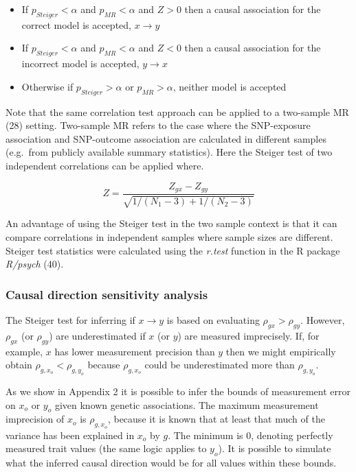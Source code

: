\documentclass[]{article}
\providecommand{\tightlist}{%
  \setlength{\itemsep}{0pt}\setlength{\parskip}{0pt}}
\begin{document}
\begin{itemize}
\tightlist
\item
  If \(p_{Steiger} < \alpha\) and \(p_{MR} < \alpha\) and \(Z > 0\) then
  a causal association for the correct model is accepted,
  \(x \rightarrow y\)
\item
  If \(p_{Steiger} < \alpha\) and \(p_{MR} < \alpha\) and \(Z < 0\) then
  a causal association for the incorrect model is accepted,
  \(y \rightarrow x\)
\item
  Otherwise if \(p_{Steiger} > \alpha\) or \(p_{MR} > \alpha\), neither
  model is accepted
\end{itemize}

Note that the same correlation test approach can be applied to a
two-sample MR (28) setting. Two-sample MR refers to the case where the
SNP-exposure association and SNP-outcome association are calculated in
different samples (e.g.~from publicly available summary statistics).
Here the Steiger test of two independent correlations can be applied
where.

\[
Z = \frac{Z_{gx} - Z_{gy}} { \sqrt{ 1 / (N_{1} - 3) + 1 / (N_{2} - 3) } }
\]

An advantage of using the Steiger test in the two sample context is that
it can compare correlations in independent samples where sample sizes
are different. Steiger test statistics were calculated using the
\emph{r.test} function in the R package \emph{R/psych} (40).

\subsubsection{Causal direction sensitivity
analysis}\label{causal-direction-sensitivity-analysis}

The Steiger test for inferring if \(x \rightarrow y\) is based on
evaluating \(\rho_{gx} > \rho_{gy}\). However, \(\rho_{gx}\) (or
\(\rho_{gy}\)) are underestimated if \(x\) (or \(y\)) are measured
imprecisely. If, for example, \(x\) has lower measurement precision than
\(y\) then we might empirically obtain \(\rho_{g,x_o} < \rho_{g,y_o}\)
because \(\rho_{g,x_o}\) could be underestimated more than
\(\rho_{g,y_o}\).

As we show in Appendix 2 it is possible to infer the bounds of
measurement error on \(x_o\) or \(y_o\) given known genetic
associations. The maximum measurement imprecision of \(x_o\) is
\(\rho_{g,x_o}\), because it is known that at least that much of the
variance has been explained in \(x_o\) by \(g\). The minimum is 0,
denoting perfectly measured trait values (the same logic applies to
\(y_o\)). It is possible to simulate what the inferred causal direction
would be for all values within these bounds.
\end{document}
